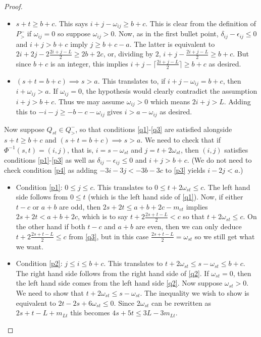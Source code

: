 \documentclass[11pt,reqno]{amsart}
\newcommand{\mms}{_}
\theoremstyle{definition}
\numberwithin{equation}{section}
\begin{document}
\begin{proof}
\begin{enumerate}
\begin{itemize}
 \item $s+t \geqslant b+c$.  This says $i+j-\omega_{ij} \geqslant b+c$.  This is clear from the definition of $P_>^-$ if 
 $\omega_{ij}=0$ so suppose $\omega_{ij}>0$.  Now, as in the first bullet point, $\delta_{ij}-\epsilon_{ij} \leqslant 0$ 
 and $i+j>b+c$ imply $j \geqslant b+c-a$. The latter is equivalent to $2i+2j-2\frac{2i+j-L}{2} \geqslant 2b+2c$, or, 
 dividing by $2$, $i+j-\frac{2i+j-L}{2} \geqslant b+c$.  But since $b+c$ is an integer, this implies 
 $i+j-\lceil\frac{2i+j-L}{2}\rceil \geqslant b+c$ as desired.

\item $(s+t=b+c) \implies s>a$.  This translates to, if $i+j-\omega_{ij}=b+c$, then $i+\omega_{ij}>a$.  If $\omega_{ij}=0$,
the hypothesis would clearly contradict the assumption $i+j>b+c$.  Thus we may assume $\omega_{ij}>0$ which 
means $2i+j > L$. Adding this to $-i-j \geqslant -b-c - \omega_{ij}$  gives $i > a-\omega_{ij}$ as desired.
\end{itemize}

Now suppose $Q\mms{st} \in Q_>^-$, so that conditions \eqref{q1}-\eqref{q3} are satisfied alongside  $s+t \geqslant b+c$ 
and $(s+t=b+c) \implies s>a$.   We need to check that if $\Phi^{-1}(s,t)=(i,j)$, that is, $i=s-\omega_{st}$ and 
$j=t+2\omega_{st}$, then $(i,j)$ satisfies conditions \eqref{p1}-\eqref{p3} as well as $\delta_{ij}-\epsilon_{ij} \leqslant 0$ 
and $i+j>b+c$. (We do not need to check condition \eqref{p4} as adding $-3i-3j<-3b-3c$ to \eqref{p3} yields $i-2j<a$.) 

\begin{itemize}
 \item Condition \eqref{p1}: $0 \leqslant j \leqslant c$.  This translates to $0 \leqslant t+2\omega_{st} \leqslant c$.  
 The left hand side follows from $0 \leqslant t$ (which is the left hand side of \eqref{q1}).  Now, if either $t-c$ or $a+b$ 
 are odd, then $2s+2t \leqslant a+b+2c-m_{ct}$ implies $2s+2t <a+b+2c$, which is to say $t+2\frac{2s+t-L}{2}<c$ 
 so that $t+2\omega_{st} \leqslant c$. On the other hand if both $t-c$ and $a+b$ are even, then we can only 
 deduce $t+2\frac{2s+t-L}{2}\leqslant c$ from \eqref{q3}, but in this case $\frac{2s+t-L}{2}=\omega_{st}$ so we still get 
 what we want.
 
 \item Condition \eqref{p2}: $j \leqslant i \leqslant b+c$. This translates to $t+2\omega_{st} \leqslant s-\omega_{st} 
 \leqslant b+c$. The right hand side follows from the right hand side of \eqref{q2}.  If $\omega_{st}=0$, then the left 
 hand side comes from the left hand side \eqref{q2}.  Now suppose $\omega_{st}>0$. We need to show that 
 $t+2\omega_{st} \leqslant s-\omega_{st}$.  The inequality we wish to show is equivalent to 
 $2t-2s+6\omega_{st} \leqslant 0$. Since $2\omega_{st}$ can be rewritten as $2s+t-L+m_{Lt}$ this becomes 
 $4s+5t \leqslant 3L-3m_{Lt}$.
 

\end{itemize}
\end{enumerate}
\end{proof}
\end{document}
